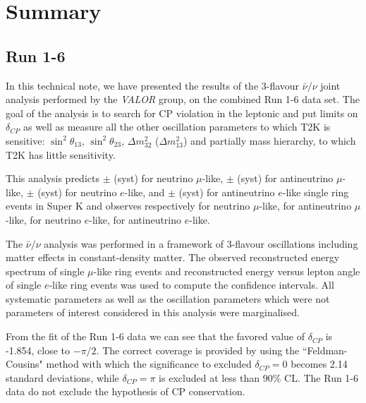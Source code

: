 \clearpage


\section{Summary}
\label{sec:summary}

\subsection{Run 1-6}
\label{sec:summary_run16}

In this technical note,
we have presented the results of the 3-flavour $\bar{\nu}/\nu$ joint analysis
performed by the {\em VALOR} group,
on the combined Run 1-6 data set.
The goal of the analysis is to search for CP violation in the leptonic
and put limits on $\delta_{CP}$ as well as 
measure all the other oscillation parameters to which T2K is sensitive:
$\sin^2 \theta_{13}$, $\sin^2 \theta_{23}$, $\Delta m^2_{32}$ ($\Delta m^2_{13}$)
and partially mass hierarchy, to which T2K has little sensitivity.

This analysis predicts 
\NskOscExpectationNumu{} $\pm$ \NskOscExpectationNumuError{} (syst) for neutrino $\mu$-like,
\NskOscExpectationNumuBar{} $\pm$ \NskOscExpectationNumuBarError{} (syst) for antineutrino $\mu$-like,
\NskOscExpectationNue{} $\pm$ \NskOscExpectationNueError{} (syst) for neutrino $e$-like,
and
\NskOscExpectationNueBar{} $\pm$ \NskOscExpectationNueBarError{} (syst) for antineutrino $e$-like
single ring events in Super K
and observes respectively 
\NskObservedNumu{} for neutrino $\mu$-like,
\NskObservedNumuBar{}  for antineutrino $\mu$-like,
\NskObservedNue{}  for neutrino $e$-like,
\NskObservedNueBar{}  for antineutrino $e$-like.

The $\bar{\nu}/\nu$ analysis was performed
in a framework of 3-flavour oscillations including matter effects in constant-density matter.
The observed reconstructed energy spectrum of single $\mu$-like ring events
and reconstructed energy versus lepton angle of single $e$-like ring events
was used to compute the confidence intervals.
All \NSyst{} systematic parameters as well as the oscillation parameters
which were not parameters of interest considered in this analysis were marginalised.

From the fit of the Run 1-6 data we can see that the favored value of $\delta_{CP}$ is -1.854, close to $-\pi/2$.
The correct coverage is provided by using the ``Feldman-Cousins" method with which the 
significance to excluded $\delta_{CP}=0$ becomes 2.14 standard deviations,
while $\delta_{CP}=\pi$ is excluded at less than 90\% CL.
The Run 1-6 data do not exclude the hypothesis of CP conservation. 

